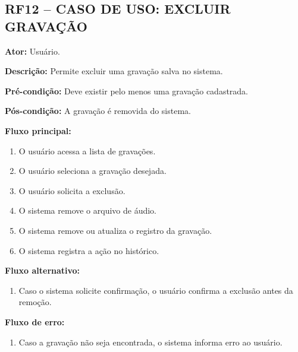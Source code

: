 \documentclass[12pt,oneside,a4paper,brazil,final]{abntex2}
\begin{document}
\clearpage
\subsection*{RF12 -- CASO DE USO: EXCLUIR GRAVAÇÃO}



\textbf{Ator:} Usuário.



\textbf{Descrição:} Permite excluir uma gravação salva no sistema.



\textbf{Pré-condição:} Deve existir pelo menos uma gravação cadastrada.



\textbf{Pós-condição:} A gravação é removida do sistema.



\textbf{Fluxo principal:}

\begin{enumerate}

    \item O usuário acessa a lista de gravações.

    \item O usuário seleciona a gravação desejada.

    \item O usuário solicita a exclusão.

    \item O sistema remove o arquivo de áudio.

    \item O sistema remove ou atualiza o registro da gravação.

    \item O sistema registra a ação no histórico.

\end{enumerate}



\textbf{Fluxo alternativo:}

\begin{enumerate}

    \item Caso o sistema solicite confirmação, o usuário confirma a exclusão antes da remoção.

\end{enumerate}



\textbf{Fluxo de erro:}

\begin{enumerate}

    \item Caso a gravação não seja encontrada, o sistema informa erro ao usuário.

\end{enumerate}
\end{document}
